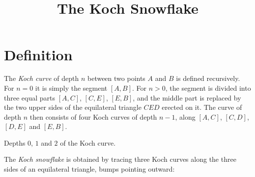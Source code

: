 \documentclass[11pt]{article}
\title{The Koch Snowflake}
\author{}
\date{}
\begin{document}
\maketitle
\thispagestyle{fancy}

\section{Definition}

The \emph{Koch curve} of depth $n$ between two points $A$ and $B$ is defined
recursively. For $n = 0$ it is simply the segment $[A, B]$. For $n > 0$, the
segment is divided into three equal parts $[A, C]$, $[C, E]$, $[E, B]$, and
the middle part is replaced by the two upper sides of the equilateral
triangle $CED$ erected on it. The curve of depth $n$ then consists of four
Koch curves of depth $n - 1$, along $[A, C]$, $[C, D]$, $[D, E]$ and
$[E, B]$.

\begin{center}

\smallskip
Depths $0$, $1$ and $2$ of the Koch curve.
\end{center}

The \emph{Koch snowflake} is obtained by tracing three Koch curves along the
three sides of an equilateral triangle, bumps pointing outward:

\begin{center}
\end{center}
\end{document}

